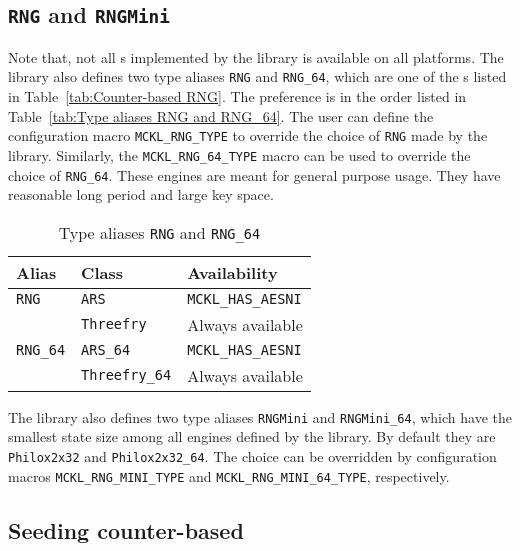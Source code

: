 \subsection{\texttt{RNG} and \texttt{RNGMini}}
\label{sub:RNG and RNGMini}

Note that, not all \rng{}s implemented by the library is available on all
platforms. The library also defines two type aliases \verb|RNG| and
\verb|RNG_64|, which are one of the \rng{}s listed in
Table~\ref{tab:Counter-based RNG}. The preference is in the order listed in
Table~\ref{tab:Type aliases RNG and RNG_64}. The user can define the
configuration macro \verb|MCKL_RNG_TYPE| to override the choice of \verb|RNG|
made by the library. Similarly, the \verb|MCKL_RNG_64_TYPE| macro can be used
to override the choice of \verb|RNG_64|. These \rng engines are meant for
general purpose usage. They have reasonable long period and large key space.

\begin{table}
  \begin{tabularx}{\textwidth}{LLL}
    \toprule
    Alias  & Class & Availability \\
    \midrule
    \verb|RNG|    & \verb|ARS|         & \verb|MCKL_HAS_AESNI| \\
                  & \verb|Threefry|    & Always available      \\
    \verb|RNG_64| & \verb|ARS_64|      & \verb|MCKL_HAS_AESNI| \\
                  & \verb|Threefry_64| & Always available      \\
    \bottomrule
  \end{tabularx}
  \caption{Type aliases \protect\texttt{RNG} and \protect\texttt{RNG\_64}}
  \label{tab:Type aliases RNG and RGN_64}
\end{table}

The library also defines two type aliases \verb|RNGMini| and \verb|RNGMini_64|,
which have the smallest state size among all \rng engines defined by the
library. By default they are \verb|Philox2x32| and \verb|Philox2x32_64|. The
choice can be overridden by configuration macros \verb|MCKL_RNG_MINI_TYPE| and
\verb|MCKL_RNG_MINI_64_TYPE|, respectively.

\subsection{Seeding counter-based \texorpdfstring{\protect\rng}{RNG}}
\label{sub:Seeding counter-based RNG}

